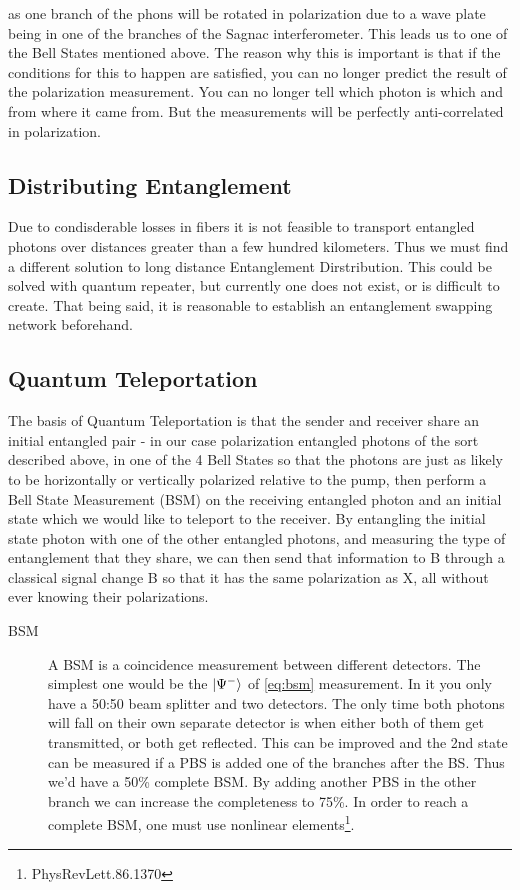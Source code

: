 \documentclass{article}
\theoremstyle{mytheoremstyle}
\theoremstyle{mytheoremstyle}
\theoremstyle{myproblemstyle}
\begin{document}
\par as one branch of the phons will be rotated in polarization due to a wave plate being in one of the branches of the Sagnac interferometer.
This leads us to one of the Bell States mentioned above.
The reason why this is important is that if the conditions for this to happen are satisfied, you can no longer
predict the result of the polarization measurement. You can no longer tell which photon is which and from where it came from.
But the measurements will be perfectly anti-correlated in polarization.

\subsection{Distributing Entanglement}
Due to condisderable losses in fibers it is not feasible to transport entangled photons over distances greater than a few hundred kilometers. Thus
we must find a different solution to long distance Entanglement Dirstribution. This could be solved with quantum repeater, but currently one does not exist,
or is difficult to create. That being said, it is reasonable to establish an entanglement swapping network beforehand.

\subsection{Quantum Teleportation}
The basis of Quantum Teleportation is that the sender and receiver share an initial entangled pair -
in our case polarization entangled photons of the sort described above, in one of the 4 Bell States
so that the photons are just as likely to be horizontally or vertically polarized relative to the pump,
then perform a Bell State Measurement (BSM) on the receiving entangled
photon and an initial state which we would like to teleport to the receiver.
By entangling the initial state photon with one of the other entangled photons, and measuring the type of entanglement that they
share, we can then send that information to B through a classical signal change B so that it has the same polarization as X,
all without ever knowing their polarizations.

\begin{description}
	\item[BSM]
		A BSM is a coincidence measurement between different detectors. The simplest one would
		be the $\ket{\Psi^-}$ of \ref{eq:bsm} measurement. In it you only have a 50:50 beam splitter and two detectors. The only
		time both photons will fall on their own separate detector is when either both of them get transmitted,
		or both get reflected. This can be improved and the 2nd state can be measured if a PBS is added one
		of the branches after the BS. Thus we'd have a 50\% complete BSM. By adding another PBS in the other
		branch we can increase the completeness to 75\%. In order to reach a complete BSM, one must use nonlinear
		elements\footnote{PhysRevLett.86.1370}.
\end{description}
\end{document}

